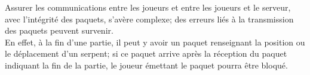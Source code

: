 \par
Assurer les communications entre les joueurs et entre les joueurs et le serveur, avec l'intégrité des paquets, s'avère complexe; des erreurs liés à la transmission des paquets peuvent survenir.\\
En effet, à la fin d'une partie, il peut y avoir un paquet renseignant la position ou le déplacement d'un serpent; si ce paquet arrive après la réception du paquet indiquant la fin de la partie, le joueur émettant le paquet pourra être bloqué.
